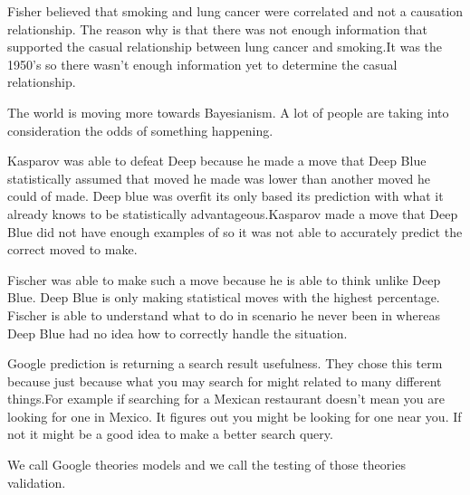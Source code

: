 \documentclass[12pt]{article}
\begin{document}
\begin{enumerate}
Fisher believed that smoking and lung cancer were correlated and not a causation relationship. The reason why is that there was not enough information that supported the casual relationship between lung cancer and smoking.It was the 1950's so there wasn't enough information yet to determine the casual relationship.  


The world is moving more towards Bayesianism. A lot of people are taking into consideration the odds of something happening. 


Kasparov was able to defeat Deep because he made a move that Deep Blue statistically assumed that moved he made was lower than another moved he could of made. Deep blue was overfit its only based its prediction with what it already knows to be statistically advantageous.Kasparov made a move that Deep Blue did not have enough examples of so it was not able to accurately predict the correct moved to make. 


Fischer was able to make such a move because he is able to think unlike Deep Blue. Deep Blue is only making statistical moves with the highest percentage. Fischer is able to understand what to do in scenario he never been in whereas Deep Blue had no idea how to correctly handle the situation. 


Google prediction is returning a search result usefulness. They chose this term because just because what you may search for might related to many different things.For example if searching for a Mexican restaurant doesn't mean you are looking for one in Mexico. It figures out you might be looking for one near you. If not it might be a good idea to make a better search query. 


We call Google theories models and we call the testing of those theories validation. 


\end{enumerate}
\end{document}
